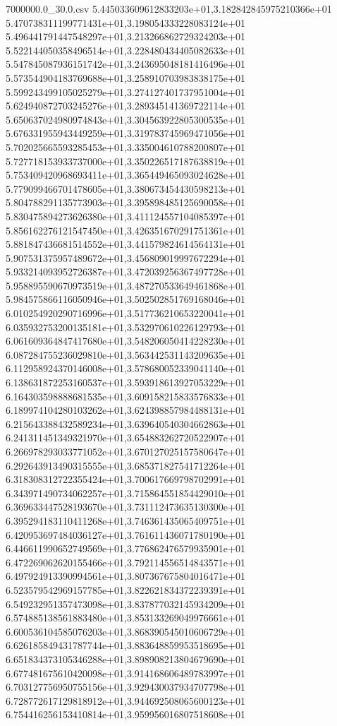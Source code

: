 \begin{filecontents*}{7000000.0_30.0.csv}
5.445033609612833203e+01,3.182842845975210366e+01
5.470738311199771431e+01,3.198054333228083124e+01
5.496441791447548297e+01,3.213266862729324203e+01
5.522144050358496514e+01,3.228480434405082633e+01
5.547845087936151742e+01,3.243695048181416496e+01
5.573544904183769688e+01,3.258910703983838175e+01
5.599243499105025279e+01,3.274127401737951004e+01
5.624940872703245276e+01,3.289345141369722114e+01
5.650637024980974843e+01,3.304563922805300535e+01
5.676331955943449259e+01,3.319783745969471056e+01
5.702025665593285453e+01,3.335004610788200807e+01
5.727718153933737000e+01,3.350226517187638819e+01
5.753409420968693411e+01,3.365449465093024628e+01
5.779099466701478605e+01,3.380673454430598213e+01
5.804788291135773903e+01,3.395898485125690058e+01
5.830475894273626380e+01,3.411124557104085397e+01
5.856162276121547450e+01,3.426351670291751361e+01
5.881847436681514552e+01,3.441579824614564131e+01
5.907531375957489672e+01,3.456809019997672294e+01
5.933214093952726387e+01,3.472039256367497728e+01
5.958895590670973519e+01,3.487270533649461868e+01
5.984575866116050946e+01,3.502502851769168046e+01
6.010254920290716996e+01,3.517736210653220041e+01
6.035932753200135181e+01,3.532970610226129793e+01
6.061609364847417680e+01,3.548206050414228230e+01
6.087284755236029810e+01,3.563442531143209635e+01
6.112958924370146008e+01,3.578680052339041140e+01
6.138631872253160537e+01,3.593918613927053229e+01
6.164303598888681535e+01,3.609158215833576833e+01
6.189974104280103262e+01,3.624398857984488131e+01
6.215643388432589234e+01,3.639640540304662863e+01
6.241311451349321970e+01,3.654883262720522907e+01
6.266978293033771052e+01,3.670127025157580647e+01
6.292643913490315555e+01,3.685371827541712264e+01
6.318308312722355424e+01,3.700617669798702991e+01
6.343971490734062257e+01,3.715864551854429010e+01
6.369633447528193670e+01,3.731112473635130300e+01
6.395294183110411268e+01,3.746361435065409751e+01
6.420953697484036127e+01,3.761611436071780190e+01
6.446611990652749569e+01,3.776862476579935901e+01
6.472269062620155466e+01,3.792114556514843571e+01
6.497924913390994561e+01,3.807367675804016471e+01
6.523579542969157785e+01,3.822621834372239391e+01
6.549232951357473098e+01,3.837877032145934209e+01
6.574885138561883480e+01,3.853133269049976661e+01
6.600536104585076203e+01,3.868390545010606729e+01
6.626185849431787744e+01,3.883648859953518695e+01
6.651834373105346288e+01,3.898908213804679690e+01
6.677481675610420098e+01,3.914168606489783997e+01
6.703127756950755156e+01,3.929430037934707798e+01
6.728772617129818912e+01,3.944692508065600123e+01
6.754416256153410814e+01,3.959956016807518608e+01

\end{filecontents*}
